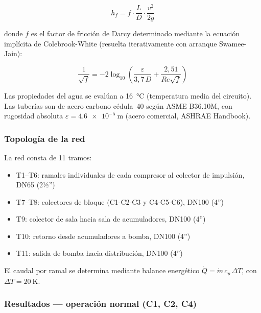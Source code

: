 \documentclass[11pt,a4paper]{article}
\begin{document}
\begin{equation}
  h_f = f \cdot \frac{L}{D} \cdot \frac{v^2}{2g}
  \label{eq:dw}
\end{equation}

donde $f$ es el factor de fricción de Darcy determinado mediante la ecuación implícita de
Colebrook-White (resuelta iterativamente con arranque Swamee-Jain):

\begin{equation}
  \frac{1}{\sqrt{f}} = -2\log_{10}\!\left(\frac{\varepsilon}{3{,}7\,D} +
  \frac{2{,}51}{Re\sqrt{f}}\right)
  \label{eq:cw}
\end{equation}

Las propiedades del agua se evalúan a \SI{16}{\celsius} (temperatura media del circuito).
Las tuberías son de acero carbono cédula~40 según ASME B36.10M, con rugosidad absoluta
$\varepsilon = \SI{4.6e-5}{\metre}$ (acero comercial, ASHRAE Handbook).

\subsubsection{Topología de la red}

La red consta de 11 tramos:
\begin{itemize}
  \item T1–T6: ramales individuales de cada compresor al colector de impulsión, DN65 (2½'')
  \item T7–T8: colectores de bloque (C1-C2-C3 y C4-C5-C6), DN100 (4'')
  \item T9: colector de sala hacia sala de acumuladores, DN100 (4'')
  \item T10: retorno desde acumuladores a bomba, DN100 (4'')
  \item T11: salida de bomba hacia distribución, DN100 (4'')
\end{itemize}

El caudal por ramal se determina mediante balance energético
$\dot{Q} = \dot{m}\,c_p\,\Delta T$, con $\Delta T = \SI{20}{\kelvin}$.

\subsubsection{Resultados — operación normal (C1, C2, C4)}
\end{document}
